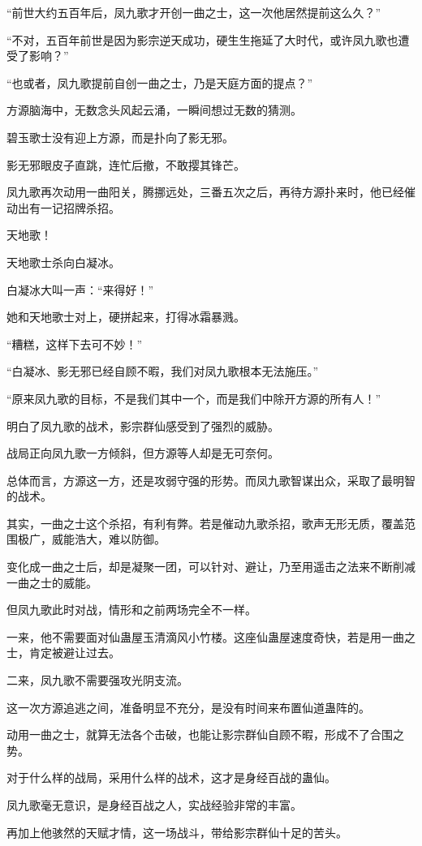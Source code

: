 \begin{this_body}
“前世大约五百年后，凤九歌才开创一曲之士，这一次他居然提前这么久？”

“不对，五百年前世是因为影宗逆天成功，硬生生拖延了大时代，或许凤九歌也遭受了影响？”

“也或者，凤九歌提前自创一曲之士，乃是天庭方面的提点？”

方源脑海中，无数念头风起云涌，一瞬间想过无数的猜测。

碧玉歌士没有迎上方源，而是扑向了影无邪。

影无邪眼皮子直跳，连忙后撤，不敢撄其锋芒。

凤九歌再次动用一曲阳关，腾挪远处，三番五次之后，再待方源扑来时，他已经催动出有一记招牌杀招。

天地歌！

天地歌士杀向白凝冰。

白凝冰大叫一声：“来得好！”

她和天地歌士对上，硬拼起来，打得冰霜暴溅。

“糟糕，这样下去可不妙！”

“白凝冰、影无邪已经自顾不暇，我们对凤九歌根本无法施压。”

“原来凤九歌的目标，不是我们其中一个，而是我们中除开方源的所有人！”

明白了凤九歌的战术，影宗群仙感受到了强烈的威胁。

战局正向凤九歌一方倾斜，但方源等人却是无可奈何。

总体而言，方源这一方，还是攻弱守强的形势。而凤九歌智谋出众，采取了最明智的战术。

其实，一曲之士这个杀招，有利有弊。若是催动九歌杀招，歌声无形无质，覆盖范围极广，威能浩大，难以防御。

变化成一曲之士后，却是凝聚一团，可以针对、避让，乃至用遥击之法来不断削减一曲之士的威能。

但凤九歌此时对战，情形和之前两场完全不一样。

一来，他不需要面对仙蛊屋玉清滴风小竹楼。这座仙蛊屋速度奇快，若是用一曲之士，肯定被避让过去。

二来，凤九歌不需要强攻光阴支流。

这一次方源追逃之间，准备明显不充分，是没有时间来布置仙道蛊阵的。

动用一曲之士，就算无法各个击破，也能让影宗群仙自顾不暇，形成不了合围之势。

对于什么样的战局，采用什么样的战术，这才是身经百战的蛊仙。

凤九歌毫无意识，是身经百战之人，实战经验非常的丰富。

再加上他骇然的天赋才情，这一场战斗，带给影宗群仙十足的苦头。


\end{this_body}
